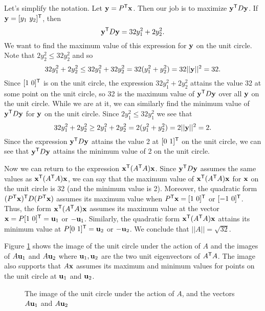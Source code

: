 \begin{example}
Let's simplify the notation. Let $\mathbf{y} = P^{\mathsf{T}}\mathbf{x}$. Then our job is to maximize $\mathbf{y}^{\mathsf{T}}D\mathbf{y}$. If $\mathbf{y} = [y_1 \ y_2]^{\mathsf{T}}$, then
\[\mathbf{y}^{\mathsf{T}} D  \mathbf{y} = 32y_1^2 + 2y_2^2.\]
We want to find the maximum value of this expression for $\mathbf{y}$ on the unit circle. Note that $2y_2^2 \leq 32y_2^2$ and so 
\[32y_1^2 + 2y_2^2 \leq 32y_1^2 + 32y_2^2 = 32(y_1^2+y_2^2) = 32||\mathbf{y}||^2 = 32.\]
Since $[1 \ 0]^{\mathsf{T}}$ is on the unit circle, the expression $32y_1^2 + 2y_2^2$ attains the value 32 at some point on the unit circle, so 32 is the maximum value of $\mathbf{y}^{\mathsf{T}} D \mathbf{y}$ over all $\mathbf{y}$ on the unit circle. While we are at it, we can similarly find the minimum value of $\mathbf{y}^{\mathsf{T}} D  \mathbf{y}$ for $\mathbf{y}$ on the unit circle. Since $2y_1^2 \leq 32y_1^2$ we see that 
\[32y_1^2 + 2y_2^2 \geq 2y_1^2 + 2y_2^2 = 2(y_1^2+y_2^2) = 2||\mathbf{y}||^2 = 2.\]
Since the expression $\mathbf{y}^{\mathsf{T}} D \mathbf{y}$ attains the value 2 at $[0 \ 1]^{\mathsf{T}}$  on the unit circle, we can see that $\mathbf{y}^{\mathsf{T}} D \mathbf{y}$ attains the minimum value of 2 on the unit circle.

Now we can return to the expression $\mathbf{x}^{\mathsf{T}} (A^{\mathsf{T}}A) \mathbf{x}$. Since $\mathbf{y}^{\mathsf{T}} D \mathbf{y}$ assumes the same values as $\mathbf{x}^{\mathsf{T}} (A^{\mathsf{T}}A) \mathbf{x}$, we can say that the maximum value of $\mathbf{x}^{\mathsf{T}} (A^{\mathsf{T}}A) \mathbf{x}$ for $\mathbf{x}$ on the unit circle is 32 (and the minimum value is 2). Moreover, the quadratic form $(P^{\mathsf{T}}\mathbf{x})^{\mathsf{T}} D (P^{\mathsf{T}}\mathbf{x})$ assumes its maximum value when $P^{\mathsf{T}}\mathbf{x} = [1 \ 0]^{\mathsf{T}}$ or $[-1 \ 0]^{\mathsf{T}}$. Thus, the form $\mathbf{x}^{\mathsf{T}} (A^{\mathsf{T}}A) \mathbf{x}$ assumes its maximum value at the vector $\mathbf{x} = P[1 \ 0 ]^{\mathsf{T}} = \mathbf{u}_1$ or $-\mathbf{u}_1$. Similarly, the quadratic form $\mathbf{x}^{\mathsf{T}} (A^{\mathsf{T}}A)  \mathbf{x}$ attains its minimum value at $P[0 \ 1]^{\mathsf{T}} = \mathbf{u}_2$ or $-\mathbf{u}_2$. We conclude that $||A|| = \sqrt{32}$.

Figure \ref{F:7_c_Mat_norm1_b} shows the image of the unit circle under the action of $A$ and the images of $A\mathbf{u}_1$ and $A\mathbf{u}_2$ where $\mathbf{u}_1, \mathbf{u}_2$ are the two unit eigenvectors of $A^{\mathsf{T}}A$. The image also supports that $A\mathbf{x}$ assumes its maximum and minimum values for points on the unit circle at $\mathbf{u}_1$ and $\mathbf{u}_2$.
\begin{figure}[h]
\begin{center}
\end{center}
\caption{The image of the unit circle under the action of $A$, and the vectors $A\mathbf{u}_1$ and $A\mathbf{u}_2$}
\label{F:7_c_Mat_norm1_b}
\end{figure}
\end{example}


